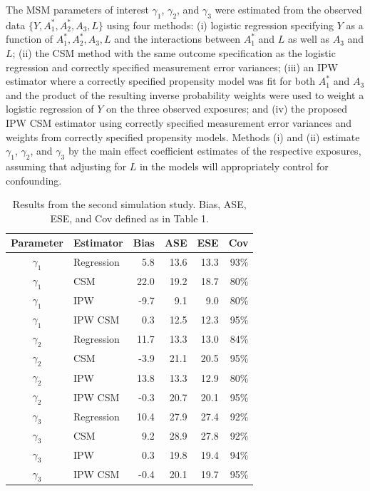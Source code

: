 \documentclass[useAMS,usenatbib,referee]{biom}
\begin{document}
The MSM parameters of interest $\gamma_{1}$, $\gamma_{2}$, and $\gamma_{3}$ were estimated from the observed data $\{ Y, A_{1}^{*}, A_{2}^{*}, A_{3}, L \}$ using four methods: (i) logistic regression specifying $Y$ as a function of $A_{1}^{*}, A_{2}^{*}, A_{3}, L$ and the interactions between $A_{1}^{*}$ and $L$ as well as $A_{3}$ and $L$; (ii) the CSM method with the same outcome specification as the logistic regression and correctly specified measurement error variances; (iii) an IPW estimator where a correctly specified propensity model was fit for both $A_{1}^{*}$ and $A_{3}$ and the product of the resulting inverse probability weights were used to weight a logistic regression of $Y$ on the three observed exposures; and (iv) the proposed IPW CSM estimator using correctly specified measurement error variances and weights from correctly specified propensity models. Methods (i) and (ii) estimate $\gamma_{1}$, $\gamma_{2}$, and $\gamma_{3}$ by the main effect coefficient estimates of the respective exposures, assuming that adjusting for $L$ in the models will appropriately control for confounding.

\begin{table}[]
    \caption{Results from the second simulation study. Bias, ASE, ESE, and Cov defined as in Table 1.}
    \begin{center}
    \begin{tabular}{clrrrr}
    \hline
        Parameter & Estimator & Bias & ASE & ESE & Cov \\
         \hline
$\gamma_{1}$ & Regression & 5.8 & 13.6 & 13.3 & 93\% \\
$\gamma_{1}$ & CSM & 22.0 & 19.2 & 18.7 & 80\% \\
$\gamma_{1}$ & IPW & -9.7 & 9.1 & 9.0 & 80\% \\
$\gamma_{1}$ & IPW CSM & 0.3 & 12.5 & 12.3 & 95\% \\[4pt]
$\gamma_{2}$ & Regression & 11.7 & 13.3 & 13.0 & 84\% \\
$\gamma_{2}$ & CSM & -3.9 & 21.1 & 20.5 & 95\% \\
$\gamma_{2}$ & IPW & 13.8 & 13.3 & 12.9 & 80\% \\
$\gamma_{2}$ & IPW CSM & -0.3 & 20.7 & 20.1 & 95\% \\[4pt]
$\gamma_{3}$ & Regression & 10.4 & 27.9 & 27.4 & 92\% \\
$\gamma_{3}$ & CSM & 9.2 & 28.9 & 27.8 & 92\% \\
$\gamma_{3}$ & IPW & 0.3 & 19.8 & 19.4 & 94\% \\
$\gamma_{3}$ & IPW CSM & -0.4 & 20.1 & 19.7 & 95\% \\
         \hline
    \end{tabular}
    \end{center}
    \label{tab:two}
\end{table}
\end{document}
